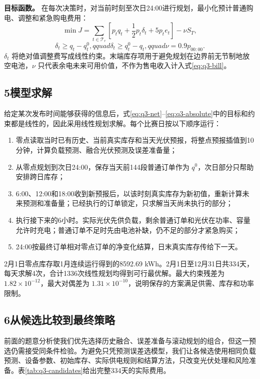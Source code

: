 \textbf{目标函数。} 在每次决策时，对当前时刻至次日24:00进行规划，最小化预计普通购电、调整和紧急购电费用：
\begin{equation}
\min J=\sum_{t\in\mathcal T_r}
\left[p_tq_t+\frac12p_t\delta_t+5p_te_t\right]-\nu S_T,
\label{eq:q3-objective}
\end{equation}
\begin{equation}
\delta_t\ge q_t-q_t^0,qquad \delta_t\ge q_t^0-q_t,qquad
\nu=0.9p_{00:00}.
\label{eq:q3-absolute}
\end{equation}
$\delta_t$ 将绝对值调整费写成线性约束。末端库存项用于避免规划在边界前无节制地放空电池，$\nu$ 只代表余电未来可用价值，不作为售电收入计入式\eqref{eq:q3-bill}。

\subsection*{5\quad 模型求解}

给定某次发布时间能够获得的信息后，式\eqref{eq:q3-net}--\eqref{eq:q3-absolute}中的目标和约束都是线性的，因此采用线性规划求解。每个比赛日按以下顺序运行：
\begin{enumerate}
\item 零点读取当时已有历史、当前真实库存和当天光伏预报，将整点预报插值到10分钟，计算负载预测、融合光伏预测及误差准备量；
\item 从零点规划到次日24:00，保存当天前144段普通订单作为 $q^0$，次日部分只帮助安排跨日库存；
\item 6:00、12:00和18:00收到新预报后，以该时刻真实库存为新初值，重新计算未来预测和准备量；已经执行的订单锁定，只求解当天尚未执行的部分；
\item 执行接下来的6小时。实际光伏先供负载，剩余普通订单和光伏在功率、容量允许时充电；普通订单不足时先由电池补缺，仍不足的部分才紧急购买；
\item 24:00按最终订单相对零点订单的净变化结算，日末真实库存传给下一天。
\end{enumerate}

2月1日零点库存取1月连续运行得到的8592.69 kWh。2月1日至12月31日共334天，每天求解4次，合计1336次线性规划均得到可行最优解。最大约束残差为 $1.82\times10^{-12}$，最大对偶差为 $1.31\times10^{-10}$，说明保存的方案满足供需、库存和功率限制。

\subsection*{6\quad 从候选比较到最终策略}

前面的题意分析使我们优先选择历史融合、误差准备与滚动规划的组合，但这一预选仍需接受同条件检验。为避免只凭预测误差选模型，我们让各候选使用相同负载预测、设备参数、初始库存、实际供电规则和结算方法，只改变光伏处理和风险准备。表\ref{tab:q3-candidates}给出完整334天的实际费用。
\begin{inlinetable}
\caption{问题三候选方案的334天费用比较}\label{tab:q3-candidates}
\end{inlinetable}

